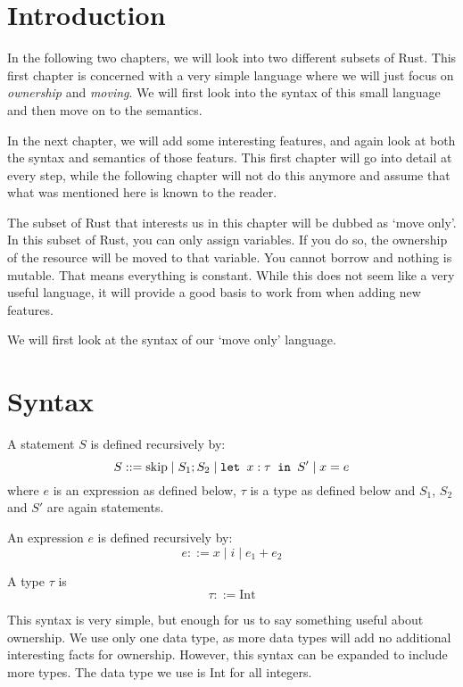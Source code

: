 \section{Introduction}
In the following two chapters, we will look into two different subsets of Rust. This first chapter is concerned with a very simple language where we will just focus on \emph{ownership} and \emph{moving}. We will first look into the syntax of this small language and then move on to the semantics. 

In the next chapter, we will add some interesting features, and again look at both the syntax and semantics of those featurs. This first chapter will go into detail at every step, while the following chapter will not do this anymore and assume that what was mentioned here is known to the reader.

The subset of Rust that interests us in this chapter will be dubbed as `move only'. In this subset of Rust, you can only assign variables. If you do so, the ownership of the resource will be moved to that variable. You cannot borrow and nothing is mutable. That means everything is constant. While this does not seem like a very useful language, it will provide a good basis to work from when adding new features.

We will first look at the syntax of our `move only' language.

\section{Syntax}
\begin{definition}
\label{statementsmove}
A statement $S$ is defined recursively by:
$$S ::= \textrm{skip} \mid S_1; S_2 \mid \texttt{let }x : \tau \texttt{ in } S' \mid x = e$$
where $e$ is an expression as defined below, $\tau$ is a type as defined below and $S_1$, $S_2$ and $S'$ are again statements.
\end{definition}

\begin{definition}
\label{expressionsmove}
An expression $e$ is defined recursively by:
$$e ::= x \mid i \mid e_1 + e_2$$
\end{definition}

\begin{definition}
\label{typesmove}
A type $\tau$ is
$$\tau ::= \textrm{Int}$$
\end{definition}

This syntax is very simple, but enough for us to say something useful about ownership. We use only one data type, as more data types will add no additional interesting facts for ownership. However, this syntax can be expanded to include more types. The data type we use is Int for all integers.

